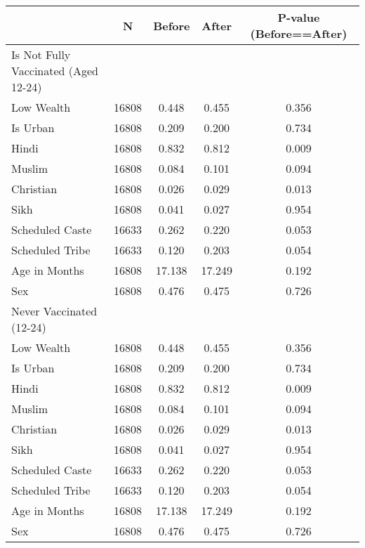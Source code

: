 \begin{tabular}{l*{4}{c}}
\hline\hline
            &           N&      Before&       After&P-value (Before==After)\\
\hline
Is Not Fully Vaccinated (Aged 12-24)&            &            &            &            \\
Low Wealth  &       16808&       0.448&       0.455&       0.356\\
Is Urban    &       16808&       0.209&       0.200&       0.734\\
Hindi       &       16808&       0.832&       0.812&       0.009\\
Muslim      &       16808&       0.084&       0.101&       0.094\\
Christian   &       16808&       0.026&       0.029&       0.013\\
Sikh        &       16808&       0.041&       0.027&       0.954\\
Scheduled Caste&       16633&       0.262&       0.220&       0.053\\
Scheduled Tribe&       16633&       0.120&       0.203&       0.054\\
Age in Months&       16808&      17.138&      17.249&       0.192\\
Sex         &       16808&       0.476&       0.475&       0.726\\
\hline
Never Vaccinated (12-24)&            &            &            &            \\
Low Wealth  &       16808&       0.448&       0.455&       0.356\\
Is Urban    &       16808&       0.209&       0.200&       0.734\\
Hindi       &       16808&       0.832&       0.812&       0.009\\
Muslim      &       16808&       0.084&       0.101&       0.094\\
Christian   &       16808&       0.026&       0.029&       0.013\\
Sikh        &       16808&       0.041&       0.027&       0.954\\
Scheduled Caste&       16633&       0.262&       0.220&       0.053\\
Scheduled Tribe&       16633&       0.120&       0.203&       0.054\\
Age in Months&       16808&      17.138&      17.249&       0.192\\
Sex         &       16808&       0.476&       0.475&       0.726\\

\end{tabular}
